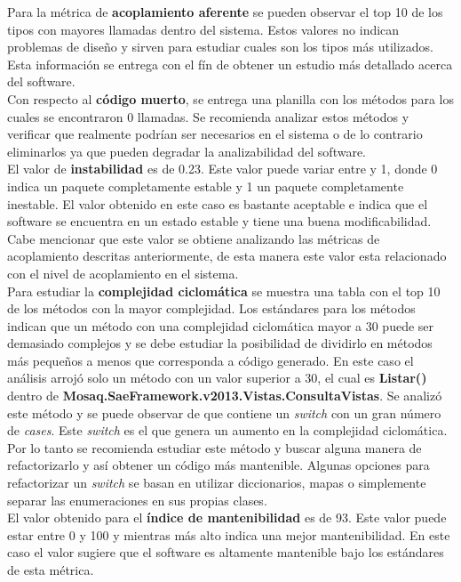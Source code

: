 Para la métrica de \textbf{acoplamiento aferente} se pueden observar el top 10 
de los tipos con mayores llamadas dentro del sistema. Estos valores no indican 
problemas de diseño y sirven para estudiar cuales son los tipos más utilizados. 
Esta información se entrega con el fín de obtener un estudio más detallado 
acerca del software.
\\

Con respecto al \textbf{código muerto}, se entrega una planilla con los métodos 
para los cuales se encontraron 0 llamadas. Se recomienda analizar estos métodos 
y verificar que realmente podrían ser necesarios en el sistema o de lo contrario 
eliminarlos ya que pueden degradar la analizabilidad del software.
\\

El valor de \textbf{instabilidad} es de 0.23. Este valor puede variar entre 
 y 1, donde 0 indica un paquete completamente estable y 1 un paquete 
completamente inestable. El valor obtenido en este caso es bastante aceptable 
e indica que el software se encuentra en un estado estable y tiene una buena 
modificabilidad. Cabe mencionar que este valor se obtiene analizando las 
métricas de acoplamiento descritas anteriormente, de esta manera este valor 
esta relacionado con el nivel de acoplamiento en el sistema.
\\

Para estudiar la \textbf{complejidad ciclomática} se muestra una tabla con 
el top 10 de los métodos con la mayor complejidad. Los estándares para los 
métodos indican que un método con una complejidad ciclomática mayor a 30 puede 
ser demasiado complejos y se debe estudiar la posibilidad de dividirlo en 
métodos más pequeños a menos que corresponda a código generado.
En este caso el análisis arrojó solo un método con un valor superior a 30, 
el cual es \textbf{Listar()} dentro de \textbf{Mosaq.SaeFramework.v2013.Vistas.ConsultaVistas}.
Se analizó este método y se puede observar de que contiene un \textit{switch} 
con un gran número de \textit{cases}. Este \textit{switch} es el que genera 
un aumento en la complejidad ciclomática. Por lo tanto se recomienda estudiar 
este método y buscar alguna manera de refactorizarlo y así obtener un código 
más mantenible. Algunas opciones para refactorizar un \textit{switch} 
se basan en utilizar diccionarios, mapas o simplemente separar las enumeraciones 
en sus propias clases.
\\

El valor obtenido para el \textbf{índice de mantenibilidad} es de 93. Este 
valor puede estar entre 0 y 100 y mientras más alto indica una mejor 
mantenibilidad. En este caso el valor sugiere que el software es altamente 
mantenible bajo los estándares de esta métrica.
\\

